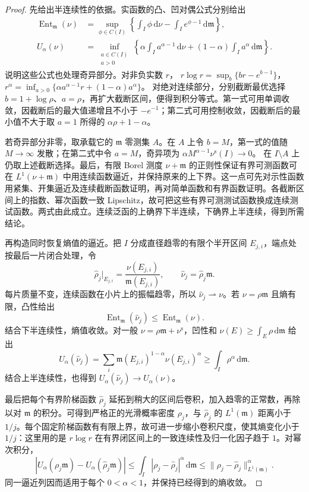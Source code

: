 \begin{proof}
	先给出半连续性的依据。实函数的凸、凹对偶公式分别给出
	\begin{align*}
		\operatorname{Ent}_{\mathfrak m}(\nu)
		&=\sup_{\phi\in C(I)}
		  \left\{\int_I\phi\,\mathrm d\nu
		          -\int_Ie^{\phi-1}\,\mathrm d\mathfrak m\right\},\\
		U_\alpha(\nu)
		&=\inf_{\substack{a\in C(I)\\a>0}}
		  \left\{\alpha\int_Ia^{\alpha-1}\,\mathrm d\nu
		    +(1-\alpha)\int_Ia^\alpha\,\mathrm d\mathfrak m\right\}.
	\end{align*}
	说明这些公式也处理奇异部分。对非负实数 \(r\)，
	\(r\log r=\sup_b\{br-e^{b-1}\}\)，
	\(r^\alpha=\inf_{a>0}\{\alpha a^{\alpha-1}r+(1-\alpha)a^\alpha\}\)。
	对绝对连续部分，分别截断最优选择 \(b=1+\log\rho\)、\(a=\rho\)，再扩大截断区间，便得到积分等式。第一式可用单调收敛，因截断后的最大值递增且不小于 \(-e^{-1}\)；第二式可用控制收敛，因截断后的最小值不大于取 \(a=1\) 所得的 \(\alpha\rho+1-\alpha\)。

	若奇异部分非零，取承载它的 \(\mathfrak m\) 零测集 \(A\)。在 \(A\) 上令 \(b=M\)，第一式的值随 \(M\to\infty\) 发散；在第二式中令 \(a=M\)，奇异项为
	\(\alpha M^{\alpha-1}\nu^{\mathrm s}(I)\to0\)。
	在 \(I\setminus A\) 上仍取上述截断选择。最后，有限 Borel 测度 \(\nu+\mathfrak m\) 的正则性保证有界可测函数可在 \(L^1(\nu+\mathfrak m)\) 中用连续函数逼近，并保持原来的上下界。这一点可先对示性函数用紧集、开集逼近及连续截断函数证明，再对简单函数和有界函数证明。各截断区间上的指数、幂次函数一致 Lipschitz，故可把这些有界可测测试函数换成连续测试函数。两式由此成立。连续泛函的上确界下半连续，下确界上半连续，得到所需结论。

	再构造同时恢复熵值的逼近。把 \(I\) 分成直径趋零的有限个半开区间 \(E_{j,i}\)，端点处按最后一片闭合处理，令
	\[
		\widehat\rho_j\big|_{E_{j,i}}
		    =\frac{\nu(E_{j,i})}{\mathfrak m(E_{j,i})},
		\qquad \widehat\nu_j=\widehat\rho_j\mathfrak m.
	\]
	每片质量不变，连续函数在小片上的振幅趋零，所以
	\(\widehat\nu_j\rightharpoonup\nu\)。若 \(\nu=\rho\mathfrak m\) 且熵有限，凸性给出
	\[
		\operatorname{Ent}_{\mathfrak m}(\widehat\nu_j)
		   \le\operatorname{Ent}_{\mathfrak m}(\nu).
	\]
	结合下半连续性，熵值收敛。对一般 \(\nu=\rho\mathfrak m+\nu^{\mathrm s}\)，凹性和
	\(\nu(E)\ge\int_E\rho\,\mathrm d\mathfrak m\) 给出
	\[
		U_\alpha(\widehat\nu_j)
		=\sum_i\mathfrak m(E_{j,i})^{1-\alpha}\nu(E_{j,i})^\alpha
		\ge\int_I\rho^\alpha\,\mathrm d\mathfrak m.
	\]
	结合上半连续性，也得到 \(U_\alpha(\widehat\nu_j)\to U_\alpha(\nu)\)。

	最后把每个有界阶梯函数 \(\widehat\rho_j\) 延拓到稍大的区间后卷积，加入趋零的正常数，再除以对 \(\mathfrak m\) 的积分。可得到严格正的光滑概率密度 \(\rho_j\)，与 \(\widehat\rho_j\) 的 \(L^1(\mathfrak m)\) 距离小于 \(1/j\)。每个固定阶梯函数有有限上界，故可进一步缩小卷积尺度，使其熵变化小于 \(1/j\)：这里用的是 \(r\log r\) 在有界闭区间上的一致连续性及归一化因子趋于 \(1\)。对幂次积分，
	\[
		|U_\alpha(\rho_j\mathfrak m)
		          -U_\alpha(\widehat\rho_j\mathfrak m)|
		\le\int_I|\rho_j-\widehat\rho_j|^\alpha\,\mathrm d\mathfrak m
		\le\|\rho_j-\widehat\rho_j\|_{L^1(\mathfrak m)}^\alpha.
	\]
	同一逼近列因而适用于每个 \(0<\alpha<1\)，并保持已经得到的熵收敛。
\end{proof}

